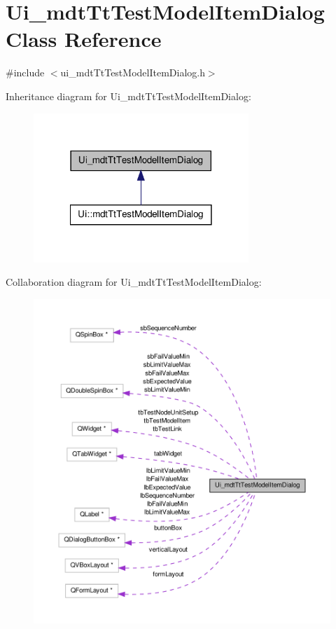 \hypertarget{class_ui__mdt_tt_test_model_item_dialog}{\section{Ui\-\_\-mdt\-Tt\-Test\-Model\-Item\-Dialog Class Reference}
\label{class_ui__mdt_tt_test_model_item_dialog}
}


{\ttfamily \#include $<$ui\-\_\-mdt\-Tt\-Test\-Model\-Item\-Dialog.\-h$>$}



Inheritance diagram for Ui\-\_\-mdt\-Tt\-Test\-Model\-Item\-Dialog\-:\nopagebreak
\begin{figure}[H]
\begin{center}
\leavevmode
\includegraphics[width=230pt]{class_ui__mdt_tt_test_model_item_dialog__inherit__graph}
\end{center}
\end{figure}


Collaboration diagram for Ui\-\_\-mdt\-Tt\-Test\-Model\-Item\-Dialog\-:\nopagebreak
\begin{figure}[H]
\begin{center}
\leavevmode
\includegraphics[width=350pt]{class_ui__mdt_tt_test_model_item_dialog__coll__graph}
\end{center}
\end{figure}
